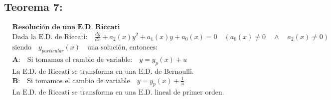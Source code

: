 \documentclass[a4paper,12pt,numbers=noenddot]{scrreprt}
\begin{document}
\subsection*{Teorema 7:}
\begin{align*}
    &\textbf{Resolución de una E.D. Riccati}\\
    &\text{Dada la E.D. de Riccati:} \quad \frac{dy}{dx} + a_2(x)y^2 + a_1(x)y + a_0(x)=0 \quad (a_0(x) \neq 0 \quad \wedge \quad a_2(x)\neq 0)\\
    &\text{siendo} \quad y_{particular}(x) \quad \text{una solución, entonces:}\\
    &\textbf{A:} \quad \text{Si tomamos el cambio de variable:} \quad y = y_{p}(x) + u\\
    &\text{La E.D. de Riccati se transforma en una E.D. de Bernoulli.}\\
    &\textbf{B:} \quad \text{Si tomamos el cambio de variable} \quad y = y_p(x) + \frac{1}{u}\\
    &\text{La E.D. de Riccati se transforma en una E.D. lineal de primer orden.}
\end{align*}
        
\end{document}
